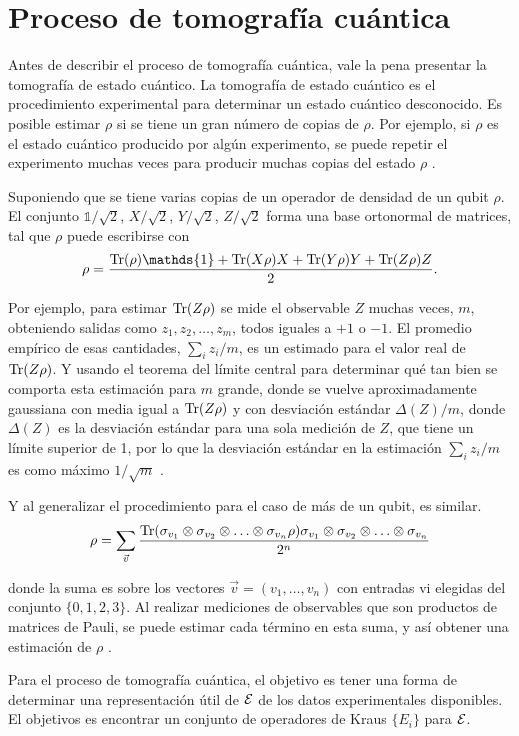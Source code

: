 \section{Proceso de tomografía cuántica}

Antes de describir el proceso de tomografía cuántica, vale la pena presentar la tomografía de estado cuántico. La tomografía de estado cuántico es el procedimiento experimental para determinar un estado cuántico desconocido. Es posible estimar $\rho$ si se tiene un gran número de copias de $\rho$. Por ejemplo, si $\rho$ es el estado cuántico producido por algún experimento, se puede repetir el experimento muchas veces para producir muchas copias del estado $\rho$ {\cite{nielsen_chuang_2010}}. 

Suponiendo que se tiene varias copias de un operador de densidad de un qubit $\rho$. El conjunto $\mathds{1}/\sqrt{2}$, $X/\sqrt{2}$, $Y/\sqrt{2}$, $Z/\sqrt{2}$ forma una base ortonormal de matrices, tal que $\rho$  puede escribirse con \[\rho=\dfrac{\tr(\rho)\mathds{1}+\tr(X\rho)X+\tr(Y\rho)Y+\tr(Z\rho)Z}{2}.\]

Por ejemplo, para estimar ${\rm Tr}(Z\rho)$ se mide el observable $Z$ muchas veces, $m$, obteniendo salidas como $z_1,z_2,\ldots,z_m$, todos iguales a $+1$ o $-1$. El promedio empírico de esas cantidades, $\sum_i z_i/m$, es un estimado para el valor real de ${\rm Tr}(Z\rho)$. Y usando el teorema del límite central para determinar qué tan bien se comporta esta estimación para $m$ grande, donde se vuelve aproximadamente gaussiana con media igual a ${\rm Tr}(Z\rho)$ y con desviación estándar  $\Delta(Z)/ m$, donde $\Delta(Z)$ es la desviación estándar para una sola medición de $Z$, que tiene un límite superior de 1, por lo que la desviación estándar en la estimación $\sum_i z_i/m$ es como máximo $1/\sqrt{m}$ {\cite{nielsen_chuang_2010}}. 

Y al generalizar el procedimiento para el caso de más de un qubit, es similar.
\[\rho=\sum_{\vec{v}}\dfrac{{\rm Tr}(\sigma_{v_1}\otimes\sigma_{v_2}\otimes \ldots \otimes \sigma_{v_n}\rho)\sigma_{v_1}\otimes\sigma_{v_2}\otimes \ldots \otimes \sigma_{v_n}}{2^n}\]

donde la suma es sobre los vectores $\vec{v} = (v_1 ,\ldots, v_n )$ con entradas vi elegidas del conjunto $\{0, 1, 2, 3\}$. Al realizar mediciones de observables que son productos de matrices de Pauli, se puede estimar cada término en esta suma, y así obtener una estimación de $\rho$ {\cite{nielsen_chuang_2010}}.

Para el proceso de tomografía cuántica, el objetivo es tener una forma de determinar una representación útil de $\mathcal{E}$  de los datos experimentales disponibles. El objetivos es encontrar un conjunto de operadores de Kraus $\{E_i\}$ para $\mathcal{E}$.


